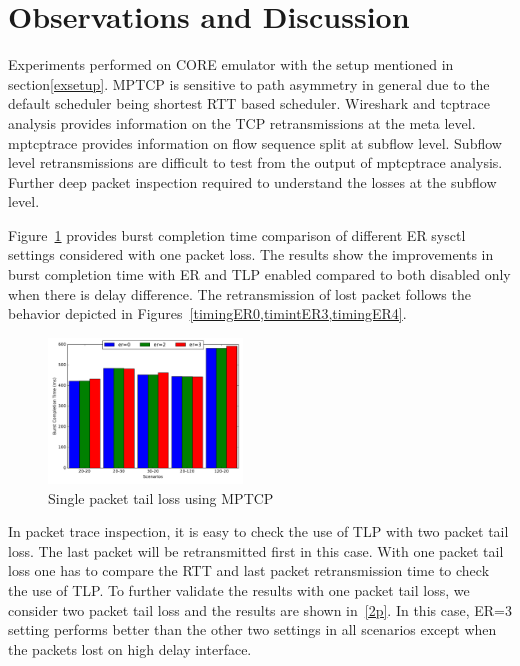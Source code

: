 \documentclass[10pt,draftcls,twocolumn]{IEEEconf}
\begin{document}
\section{Observations and Discussion}\label{disc}

Experiments performed on CORE emulator with the setup mentioned in section\ref{exsetup}.
MPTCP is sensitive to path asymmetry in general due to the default scheduler being shortest RTT based scheduler. Wireshark and tcptrace
analysis provides information on the TCP retransmissions at the meta level. mptcptrace provides information on flow sequence split at 
subflow level. Subflow level retransmissions are difficult to test from the output of mptcptrace analysis. Further deep packet inspection
required to understand the losses at the subflow level. 


Figure~\ref{1p} provides burst completion time comparison of different ER sysctl settings considered with one packet loss. The results show the improvements
in burst completion time with ER and TLP enabled compared to both disabled only when there is delay difference. The retransmission of lost packet follows the behavior 
depicted in Figures~\ref{timingER0,timintER3,timingER4}.

\begin{figure}[!ht]
\begin{center}
\includegraphics[angle=0, width=0.46\textwidth,natwidth=578.16,natheight=433.62]{plots/1P.pdf}
\caption{Single packet tail loss using MPTCP}\label{1p}
\end{center}
\end{figure}

In packet trace inspection, it is easy to check the use of TLP with two packet tail loss. The last packet will be retransmitted first in this case.
With one packet tail loss one has to compare the RTT and last packet retransmission time to check the use of TLP.
To further validate the results with one packet tail loss, we consider two packet tail loss and the results are shown in~\ref{2p}.
In this case, ER=3 setting performs better than the other two settings in all scenarios except when the packets lost on high delay interface. 
\end{document}
